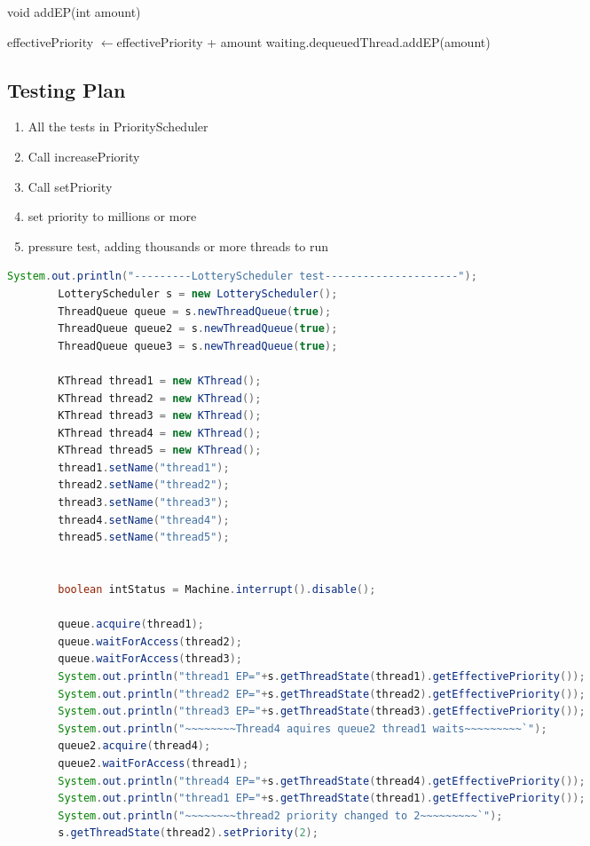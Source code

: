 \documentclass{article}
\renewcommand{\gets}{%
  \ensuremath{\leftarrow}}
\begin{document}
\begin{spacing}{1.1}
\begin{algorithm}
  \caption{void \textsf{addEP}(int amount)}
  \textsf{effectivePriority \gets effectivePriority + amount}\;
  \textsf{waiting.dequeuedThread.addEP(amount)}\;
\end{algorithm}

\subsection{Testing Plan}
\begin{enumerate}
\item All the tests in \textsf{PriorityScheduler}
\item Call \textsf{increasePriority}
\item Call \textsf{setPriority}
\item set priority to millions or more
\item pressure test, adding thousands or more threads to run
\end{enumerate}

\begin{lstlisting}[language=Java]
System.out.println("---------LotteryScheduler test---------------------");
		LotteryScheduler s = new LotteryScheduler();
		ThreadQueue queue = s.newThreadQueue(true);
		ThreadQueue queue2 = s.newThreadQueue(true);
		ThreadQueue queue3 = s.newThreadQueue(true);

		KThread thread1 = new KThread();
		KThread thread2 = new KThread();
		KThread thread3 = new KThread();
		KThread thread4 = new KThread();
		KThread thread5 = new KThread();
		thread1.setName("thread1");
		thread2.setName("thread2");
		thread3.setName("thread3");
		thread4.setName("thread4");
		thread5.setName("thread5");


		boolean intStatus = Machine.interrupt().disable();

		queue.acquire(thread1);
		queue.waitForAccess(thread2);
		queue.waitForAccess(thread3);
		System.out.println("thread1 EP="+s.getThreadState(thread1).getEffectivePriority());
		System.out.println("thread2 EP="+s.getThreadState(thread2).getEffectivePriority());
		System.out.println("thread3 EP="+s.getThreadState(thread3).getEffectivePriority());
		System.out.println("~~~~~~~~Thread4 aquires queue2 thread1 waits~~~~~~~~~`");
		queue2.acquire(thread4);
		queue2.waitForAccess(thread1);
		System.out.println("thread4 EP="+s.getThreadState(thread4).getEffectivePriority());
		System.out.println("thread1 EP="+s.getThreadState(thread1).getEffectivePriority());
		System.out.println("~~~~~~~~thread2 priority changed to 2~~~~~~~~~`");
		s.getThreadState(thread2).setPriority(2);


\end{lstlisting}
\end{spacing}
\end{document}
